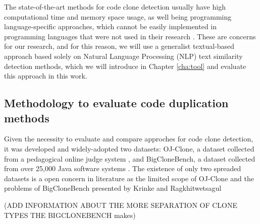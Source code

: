 The state-of-the-art methods for code clone detection usually have high computational time and memory space 
usage, as well being programming language-specific approaches, which cannot be easily implemented in programming 
languages that were not used in their research \citep{litreview}. 
These are concerns for our research, and for this reason, we will use a generalist textual-based approach 
based solely on Natural Language Processing (NLP) text similarity detection methods, which we will introduce 
in Chapter \ref{cha:tool} and evaluate this approach in this work.

\subsection{Methodology to evaluate code duplication methods}

\label{subsec:codemethods}

Given the necessity to evaluate and compare approches for code clone detection, it was developed and widely-adopted two datasets: 
OJ-Clone, a dataset collected from a pedagogical online judge system \citep{ojclone}, and BigCloneBench, a dataset collected from over 
25,000 Java software systems \citep{bigclonebench}. The existence of only two spreaded datasets is a open concern in literature as 
the limited scope of OJ-Clone and the problems of BigCloneBench presented by Krinke and Ragkhitwetsagul \citep{bigfail}

(ADD INFORMATION ABOUT THE MORE SEPARATION OF CLONE TYPES THE BIGCLONEBENCH makes)











